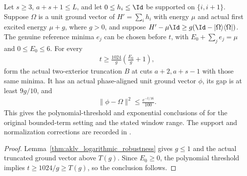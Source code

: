 \begin{lemma}
    \label{thm:aklv_physical_robustness}
    \leanok
    Let $s\ge3$, $a+s+1\le L$, and let $0\le h_i\le\Id$ be supported on
    $\{i,i+1\}$. Suppose $\Omega$ is a unit ground vector of
    $H'=\sum_i h_i$ with energy $\mu$ and actual first excited energy
    $\mu+g$, where $g>0$, and suppose
    $H'-\mu\Id\ge g(\Id-|\Omega\rangle\langle\Omega|)$.
    The genuine reference minima $e_j$ can be chosen before $t$, with
    $E_0+\sum_j e_j=\mu$ and $0\le E_0\le6$.
    For every
    \begin{align}
        t\ge\frac{1024}{g}\left(\frac{E_0}{g}+1\right),
        \label{eq:aklv_physical_polynomial_threshold}
    \end{align}
    form the actual two-exterior truncation $B$ at cuts $a+2,a+s-1$
    with those same minima. It has an actual phase-aligned unit ground
    vector $\phi$, its gap is at least $9g/10$, and
    \begin{align}
        \|\phi-\Omega\|^2\le\frac{e^{-t/16}}{100}.
        \label{eq:aklv_physical_robustness_error}
    \end{align}
    This gives the polynomial-threshold and exponential conclusions of
    \cite[Theorem~6.1]{Arad2013AreaLaw} for the original bounded-term setting
    and the stated window range. The support and normalization corrections
    are recorded in \cite{gap:aklv13_two_block_robustness}.
\end{lemma}
\begin{proof}
    \leanok
    Lemma~\ref{thm:aklv_logarithmic_robustness} gives $g\le1$ and
    the actual truncated ground vector above $T(g)$.
    Since $E_0\ge0$, the polynomial threshold implies
    $t\ge1024/g\ge T(g)$, so the conclusion follows.
\end{proof}

